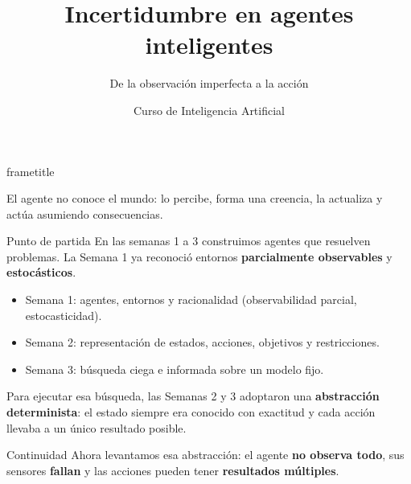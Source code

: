 \documentclass[aspectratio=169,10pt]{beamer}
\title[IA · Clase 4]{Incertidumbre en agentes inteligentes}
\subtitle{De la observación imperfecta a la acción}
\author{Curso de Inteligencia Artificial}
\institute{Semana 4 · Clase 4}
\date{}
\newcommand{\concepto}[1]{\textcolor{UAPTeal}{\textbf{#1}}}
\newcommand{\br}{\\}
\begin{document}
\begin{frame}[plain]
  \begin{beamercolorbox}[wd=\paperwidth,ht=\paperheight,sep=2em]{frametitle}
    \vfill
    {\Huge\inserttitle\par}
    \vspace{.45em}
    {\Large\insertsubtitle\par}
    \vspace{1.1em}
    \par
    \vspace{.7em}
    {\color{white}\small El agente no conoce el mundo: lo percibe, forma una creencia, la actualiza y actúa asumiendo consecuencias.\par}
    \vfill
    {\color{UAPGold}\large\insertauthor\par}
    {\color{white}\insertinstitute\par}
  \end{beamercolorbox}
\end{frame}

\begin{frame}{Punto de partida}
  \small
  En las semanas 1 a 3 construimos agentes que resuelven problemas. La Semana 1 ya reconoció entornos \concepto{parcialmente observables} y \concepto{estocásticos}.
  \begin{itemize}
    \item Semana 1: agentes, entornos y racionalidad (observabilidad parcial, estocasticidad).
    \item Semana 2: representación de estados, acciones, objetivos y restricciones.
    \item Semana 3: búsqueda ciega e informada sobre un modelo fijo.
  \end{itemize}
  Para ejecutar esa búsqueda, las Semanas 2 y 3 adoptaron una \textbf{abstracción determinista}: el estado siempre era conocido con exactitud y cada acción llevaba a un único resultado posible.
  \begin{block}{Continuidad}
    Ahora levantamos esa abstracción: el agente \textbf{no observa todo}, sus sensores \textbf{fallan} y las acciones pueden tener \textbf{resultados múltiples}.
  \end{block}
\end{frame}
\end{document}
